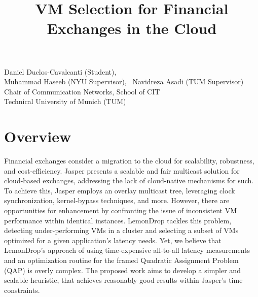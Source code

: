 \documentclass{article}
\title{VM Selection for Financial Exchanges in the Cloud}
\makeatletter
\renewcommand{\maketitle}{%
    \thispagestyle{fancy}%
    \begin{center}
        \Large\bfseries\@title
    \end{center}
    \vspace{-0.25cm}
    \begin{center}
        Daniel Duclos-Cavalcanti (Student),
        \\
        Muhammad Haseeb (NYU Supervisor),
        ~Navidreza Asadi (TUM Supervisor) 
        \\Chair of Communication Networks, School of CIT
        \\Technical University of Munich (TUM)
    \end{center}
}
\makeatother
\begin{document}
\maketitle

\section{Overview}


Financial exchanges consider a migration to the cloud for scalability, robustness, and cost-efficiency.
Jasper \cite{haseeb2024jasper} presents a scalable and fair multicast solution for cloud-based exchanges, 
addressing the lack of cloud-native mechanisms for such. 
To achieve this, Jasper employs an overlay multicast tree, leveraging clock synchronization, kernel-bypass techniques, 
and more.
However, there are opportunities for enhancement by confronting the issue of inconsistent VM performance 
within identical instances. LemonDrop \cite{sachidananda2022scheduling} tackles this problem, detecting under-performing VMs in a cluster 
and selecting a subset of VMs optimized for a given application's latency needs.
Yet, we believe that LemonDrop's approach of using time-expensive all-to-all latency measurements and an optimization routine 
for the framed Quadratic Assignment Problem (QAP) is overly complex. 
The proposed work aims to develop a simpler and scalable heuristic, that achieves reasonably good results
within Jasper's time constraints.
\end{document}
